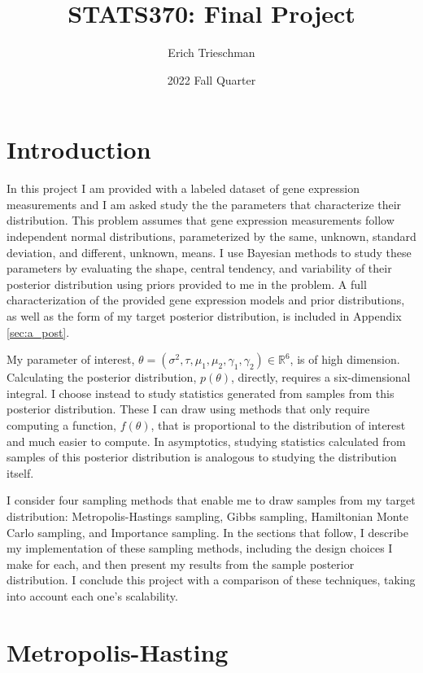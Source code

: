 \documentclass{article}
\title{STATS370: Final Project}
\author{Erich Trieschman}
\date{2022 Fall Quarter}
\begin{document}
\maketitle


\section{Introduction}
In this project I am provided with a labeled dataset of gene expression measurements and I am asked study the the parameters that characterize their distribution. This problem assumes that gene expression measurements follow independent normal distributions, parameterized by the same, unknown, standard deviation, and different, unknown, means. I use Bayesian methods to study these parameters by evaluating the shape, central tendency, and variability of their posterior distribution using priors provided to me in the problem. A full characterization of the provided gene expression models and prior distributions, as well as the form of my target posterior distribution, is included in Appendix \ref{sec:a_post}. 

My parameter of interest, $\theta = (\sigma^2, \tau, \mu_1, \mu_2, \gamma_1, \gamma_2) \in \mathbb{R}^6$, is of high dimension. Calculating the posterior distribution, $p(\theta)$, directly, requires a six-dimensional integral. I choose instead to study statistics generated from samples from this posterior distribution. These I can draw using methods that only require computing a function, $f(\theta)$, that is proportional to the distribution of interest and much easier to compute. In asymptotics, studying statistics calculated from samples of this posterior distribution is analogous to studying the distribution itself.

I consider four sampling methods that enable me to draw samples from my target distribution: Metropolis-Hastings sampling, Gibbs sampling, Hamiltonian Monte Carlo sampling, and Importance sampling. In the sections that follow, I describe my implementation of these sampling methods, including the design choices I make for each, and then present my results from the sample posterior distribution. I conclude this project with a comparison of these techniques, taking into account each one's scalability.



\section{Metropolis-Hasting}
\label{sec:MH}
\end{document}
